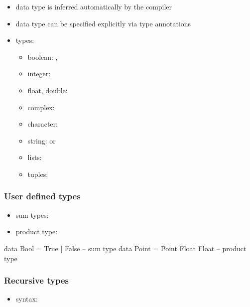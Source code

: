 \documentclass[a4paper,landscape,10pt]{article}
\begin{document}
\begin{multicols*}{2}
  \begin{itemize}
    \item data type is inferred automatically by the compiler
    \item data type can be specified explicitly via type annotations \ihaskell{::}
    \item types:
          \begin{itemize}
            \item boolean: , 
            \item integer: 
            \item float, double: 
            \item complex: 
            \item character: 
            \item string: \ihaskell{["a", "b", "c"]} or 
            \item lists: \ihaskell{[1, 2, 3]}
            \item tuples: 
          \end{itemize}
  \end{itemize}

  \subsubsection{User defined types}

  \begin{itemize}
    \item sum types: 
    \item product type: 
  \end{itemize}

  \begin{haskell}
data Bool = True | False -- sum type
data Point = Point Float Float -- product type
\end{haskell}

  \subsubsection{Recursive types}

  \begin{itemize}
    \item syntax: 
  \end{itemize}


\end{multicols*}
\end{document}
